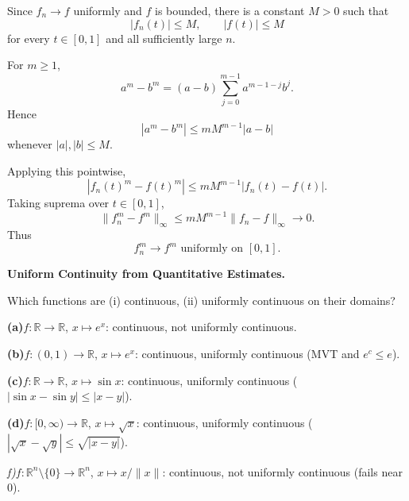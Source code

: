 \begin{solution}
Since \(f_n\to f\) uniformly and \(f\) is bounded, there is a constant \(M>0\) such that
\[
|f_n(t)|\le M,
\qquad
|f(t)|\le M
\]
for every \(t\in[0,1]\) and all sufficiently large \(n\).

For \(m\ge1\),
\[
a^m-b^m
=
(a-b)
\sum_{j=0}^{m-1}
a^{m-1-j}b^j.
\]
Hence
\[
|a^m-b^m|
\le
mM^{m-1}|a-b|
\]
whenever \(|a|,|b|\le M\).

Applying this pointwise,
\[
|f_n(t)^m-f(t)^m|
\le
mM^{m-1}|f_n(t)-f(t)|.
\]
Taking suprema over \(t\in[0,1]\),
\[
\|f_n^m-f^m\|_\infty
\le
mM^{m-1}\|f_n-f\|_\infty
\longrightarrow0.
\]
Thus
\[
\boxed{
f_n^m\to f^m
\text{ uniformly on }[0,1].
}
\]
\end{solution}


\begin{problem}[CP-II-0109]
\label{prob:cp-ii-0109}
\textbf{Uniform Continuity from Quantitative Estimates.}

\hspace*{1.5em}Which functions are (i) continuous, (ii) uniformly continuous on their domains?

\renewcommand\labelenumi{(\alph{enumi})}
\par\smallskip\noindent\textbf{(a)}\quad $f:\mathbb{R}\to\mathbb{R}$, $x\mapsto e^x$: continuous, not uniformly continuous.
\par\smallskip\noindent\textbf{(b)}\quad $f:(0,1)\to\mathbb{R}$, $x\mapsto e^x$: continuous, uniformly continuous (MVT and $e^c\le e$).
\par\smallskip\noindent\textbf{(c)}\quad $f:\mathbb{R}\to\mathbb{R}$, $x\mapsto\sin x$: continuous, uniformly continuous ($|\sin x-\sin y|\le |x-y|$).
\par\smallskip\noindent\textbf{(d)}\quad $f:[0,\infty)\to\mathbb{R}$, $x\mapsto \sqrt{x}$: continuous, uniformly continuous ($|\sqrt{x}-\sqrt{y}|\le \sqrt{|x-y|}$).
\par\noindent \textit{f)}\quad $f:\mathbb{R}^n\setminus\{0\}\to\mathbb{R}^n$, $x\mapsto x/\|x\|$: continuous, not uniformly continuous (fails near $0$).
\end{problem}

